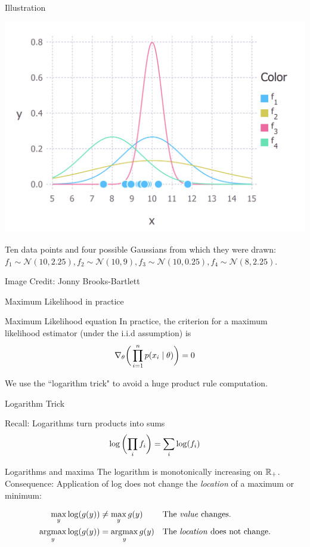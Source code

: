 \documentclass[10pt]{beamer}
\renewcommand{\it}[1]{\textit{{#1}}}
\newcommand{\bp}[1]{\bigg(  {#1} \bigg)}
\begin{document}
\begin{frame}{Illustration}
\begin{center}
\includegraphics[width=.8\textwidth]{images/ml_example}

\vfill
\scriptsize Ten data points and four possible Gaussians from which they were drawn: $f_1 \sim \mathcal{N}(10, 2.25), f_2 \sim \mathcal{N}(10, 9), f_3 \sim \mathcal{N}(10, 0.25), f_4 \sim \mathcal{N}(8, 2.25)$.   \\ %
\end{center}
\hfill \tiny Image Credit: Jonny Brooks-Bartlett
\end{frame}


\begin{frame}{Maximum Likelihood in practice}
\begin{sblock}{Maximum Likelihood equation}
In practice, the criterion for a maximum likelihood estimator (under the i.i.d assumption) is 
\[ \nabla_\theta \bigg( \displaystyle\prod_{i=1}^n p(x_i \; | \; \theta) \bigg) =0  \]
\end{sblock}
We use the ``logarithm trick" to avoid a huge product rule computation.
\end{frame}


\begin{frame}{Logarithm Trick}

\begin{sblock}{Recall: Logarithms turn products into sums}
\[ \log \bp{\ds\prod_i f_i} = \ds\sum_i  \log (f_i) \]
\end{sblock}

\begin{sblock}{Logarithms and maxima}
The logarithm is monotonically increasing on $\mathbb{R}_+$.\\

Consequence: Application of log does not change the \it{location} of a maximum or minimum:

\begin{align*}
\max_y \log (g(y)) &\neq \max_y g(y)  && \text{The \it{value} changes.} \\
\argmax_y \log (g(y)) &= \argmax_y g(y)  && \text{The \it{location} does not change.}
\end{align*}


\end{sblock}


\end{frame}
\end{document}
